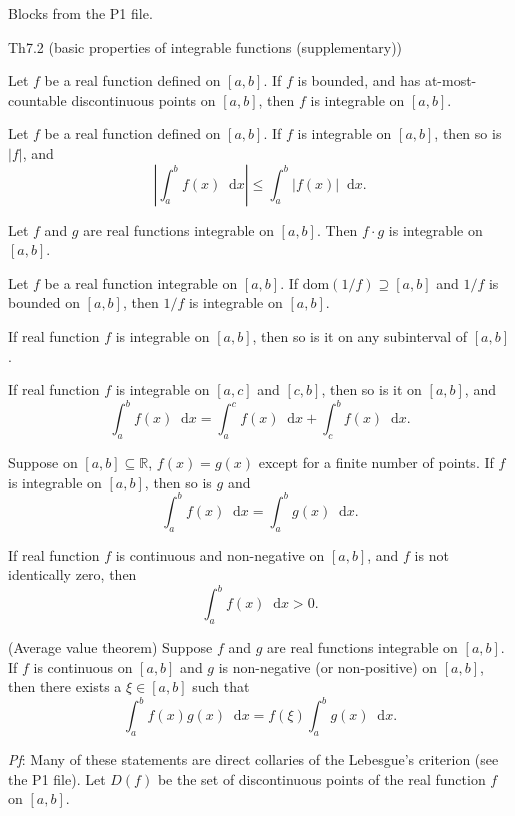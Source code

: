 \documentclass{article}
\newcommand{\dif}{\mathop{}\!\mathrm{d}}
\begin{document}
\begin{Th}{Blocks from the P1 file.}
\end{Th}

\begin{Th}{Th7.2 (basic properties of integrable functions (supplementary))}
    \begin{compactenum}
        \item Let $f$ be a real function defined on $[a, b]$. If $f$ is bounded, and has at-most-countable discontinuous points on $[a, b]$, then $f$ is integrable on $[a, b]$.
        \item Let $f$ be a real function defined on $[a, b]$. If $f$ is integrable on $[a, b]$, then so is $|f|$, and 
            $$\left| \int_a^b f(x)\dif x \right| \leq \int_a^b |f(x)|\dif x.$$
        \item Let $f$ and $g$ are real functions integrable on $[a, b]$. Then $f\cdot g$ is integrable on $[a, b]$.
        \item Let $f$ be a real function integrable on $[a, b]$. If $\text{dom}(1/f)\supseteq [a,b]$ and $1/f$ is bounded on $[a, b]$, then $1/f$ is integrable on $[a, b]$.
        \item If real function $f$ is integrable on $[a, b]$, then so is it on any subinterval of $[a, b]$.
        \item If real function $f$ is integrable on $[a, c]$ and $[c, b]$, then so is it on $[a, b]$, and
            $$\int_a^b f(x)\dif x = \int_a^c f(x)\dif x + \int_c^b f(x)\dif x.$$
        \item Suppose on $[a, b]\subseteq\mathbb{R}$, $f(x) = g(x)$ except for a finite number of points. If $f$ is integrable on $[a, b]$, then so is $g$ and
            $$\int_a^b f(x)\dif x = \int_a^b g(x)\dif x.$$
        \item If real function $f$ is continuous and non-negative on $[a, b]$, and $f$ is not identically zero, then 
            $$\int_a^b f(x)\dif x > 0.$$
        \item (Average value theorem) Suppose $f$ and $g$ are real functions integrable on $[a, b]$. If $f$ is continuous on $[a, b]$ and $g$ is non-negative (or non-positive) on $[a, b]$, then there exists a $\xi\in[a, b]$ such that
            $$\int_a^b f(x)g(x)\dif x = f(\xi)\int_a^b g(x)\dif x.$$
    \end{compactenum}
    \tcblower
    \textit{Pf}: Many of these statements are direct collaries of the Lebesgue's criterion (see the P1 file). Let $D(f)$ be the set of discontinuous points of the real function $f$ on $[a, b]$.  

\end{Th}
\end{document}
